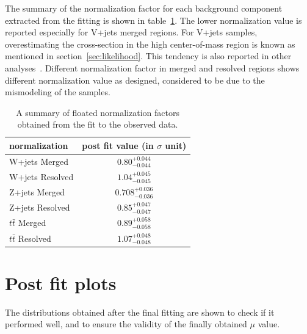 The summary of the normalization factor for each background component extracted from the fitting is shown in table~\ref{tab:postnorm}. 
The lower normalization value is reported especially for V+jets merged regions. 
For V+jets samples, overestimating the cross-section in the high center-of-mass region is known as mentioned in section~\ref{sec:likelihood}. 
This tendency is also reported in other analyses~\cite{EXOT-2016-28}. 
Different normalization factor in merged and resolved regions shows different normalization value as designed, considered to be due to the mismodeling of the samples.
\begin{table}[htbp]
\begin{center}
\begin{tabular}{|l|c|}
\hline
normalization & post fit value (in $\sigma$ unit) \\\hline
W+jets Merged & $0.80^{+0.044}_{-0.044}$ \\
W+jets Resolved & $1.04^{+0.045}_{-0.045}$ \\
Z+jets Merged & $0.708^{+0.036}_{-0.036}$ \\
Z+jets Resolved & $0.85^{+0.047}_{-0.047}$ \\
$t\bar{t}$ Merged & $0.89^{+0.058}_{-0.058}$ \\
$t\bar{t}$ Resolved & $1.07^{+0.048}_{-0.048}$ \\
\hline
\end{tabular}
\caption{\label{tab:postnorm} A summary of floated normalization factors obtained from the fit to the observed data.}
\end{center}
\end{table}

\section{Post fit plots}
\label{sec:postfitplots}
The distributions obtained after the final fitting are shown to check if it performed well, and to ensure the validity of the finally obtained $\mu$ value.
